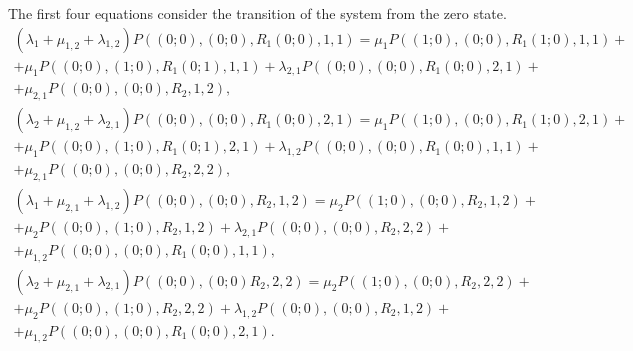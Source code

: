 {The first four equations consider the transition of the system from
the zero state.
\begin{multline}
  \left(\lambda_1+\mu_{1,2}+\lambda_{1,2}\right)
  P\left((0;0),(0;0),R_1(0;0),1,1\right)=\mu_1
  P\left((1;0),(0;0),R_1(1;0),1,1\right)+\\ +\mu_1
  P\left((0;0),(1;0),R_1(0;1),1,1\right)+\lambda_{2,1}
  P\left((0;0),(0;0),R_1(0;0),2,1\right)+\\ +\mu_{2,1}
  P\left((0;0),(0;0),R_2,1,2\right),
\label{eq:1.1}
\end{multline}
\begin{multline}
  \left(\lambda_2+\mu_{1,2}+\lambda_{2,1}\right)
  P\left((0;0),(0;0),R_1(0;0),2,1\right)=\mu_1
  P\left((1;0),(0;0),R_1(1;0),2,1\right)+\\ +\mu_1
  P\left((0;0),(1;0),R_1(0;1),2,1\right)+\lambda_{1,2}
  P\left((0;0),(0;0),R_1(0;0),1,1\right)+\\ +\mu_{2,1}
  P\left((0;0),(0;0),R_2,2,2\right),
\label{eq:1.2}
\end{multline}
\begin{multline}
  \left(\lambda_1+\mu_{2,1}+\lambda_{1,2}\right)
  P\left((0;0),(0;0),R_2,1,2\right)=\mu_2
  P\left((1;0),(0;0),R_2,1,2\right)+\\ +\mu_2
  P\left((0;0),(1;0),R_2,1,2\right)+\lambda_{2,1}
  P\left((0;0),(0;0),R_2,2,2\right)+\\ +\mu_{1,2}
  P\left((0;0),(0;0),R_1(0;0),1,1\right),
\label{eq:1.3}
\end{multline}
\begin{multline}
  \left(\lambda_2+\mu_{2,1}+\lambda_{2,1}\right)
  P\left((0;0),(0;0)R_2,2,2\right)=\mu_2
  P\left((1;0),(0;0),R_2,2,2\right)+\\ +\mu_2
  P\left((0;0),(1;0),R_2,2,2\right)+\lambda_{1,2}P\left((0;0),(0;0),R_2,1,2\right)+\\
  +\mu_{1,2}P\left((0;0),(0;0),R_1(0;0),2,1\right).
\label{eq:1.4}
\end{multline}

}
